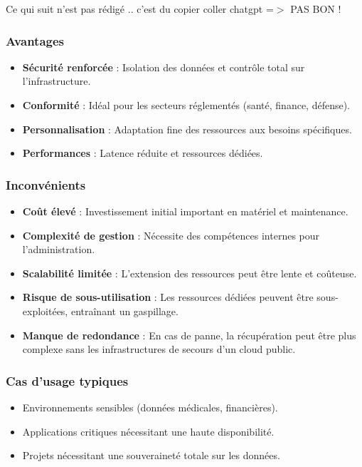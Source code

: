 \documentclass{rapportClass} %
\begin{document}
{\color{red} Ce qui suit n'est pas rédigé .. c'est du copier coller chatgpt  =$>$ PAS BON !}
\subsubsection{Avantages}
\begin{itemize}
    \item \textbf{Sécurité renforcée} : Isolation des données et contrôle total sur l’infrastructure.
    \item \textbf{Conformité} : Idéal pour les secteurs réglementés (santé, finance, défense).
    \item \textbf{Personnalisation} : Adaptation fine des ressources aux besoins spécifiques.
    \item \textbf{Performances} : Latence réduite et ressources dédiées.
\end{itemize}

\subsubsection{Inconvénients}
\begin{itemize}
    \item \textbf{Coût élevé} : Investissement initial important en matériel et maintenance.
    \item \textbf{Complexité de gestion} : Nécessite des compétences internes pour l’administration.
    \item \textbf{Scalabilité limitée} : L’extension des ressources peut être lente et coûteuse.
    \item \textbf{Risque de sous-utilisation} : Les ressources dédiées peuvent être sous-exploitées, entraînant un gaspillage.
    \item \textbf{Manque de redondance} : En cas de panne, la récupération peut être plus complexe sans les infrastructures de secours d’un cloud public.
\end{itemize}

\subsubsection{Cas d’usage typiques}
\begin{itemize}
    \item Environnements sensibles (données médicales, financières).
    \item Applications critiques nécessitant une haute disponibilité.
    \item Projets nécessitant une souveraineté totale sur les données.
\end{itemize}
\end{document}
